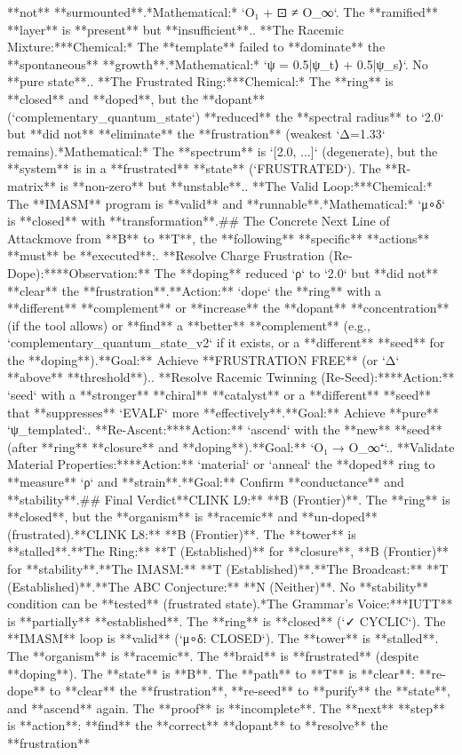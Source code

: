 **not** **surmounted**.\n    *   *Mathematical:* `O₁ + ⊡ ≠ O_∞`. The **ramified** **layer** is **present** but **insufficient**.\n{}.  **The Racemic Mixture:**\n    *   *Chemical:* The **template** failed to **dominate** the **spontaneous** **growth**.\n    *   *Mathematical:* `ψ = 0.5|ψ_t⟩ + 0.5|ψ_s⟩`. No **pure state**.\n{}.  **The Frustrated Ring:**\n    *   *Chemical:* The **ring** is **closed** and **doped**, but the **dopant** (`complementary_quantum_state`) **reduced** the **spectral radius** to `2.0` but **did not** **eliminate** the **frustration** (weakest `Δ=1.33` remains).\n    *   *Mathematical:* The **spectrum** is `[2.0, ...]` (degenerate), but the **system** is in a **frustrated** **state** (`FRUSTRATED`). The **R-matrix** is **non-zero** but **unstable**.\n{}.  **The Valid Loop:**\n    *   *Chemical:* The **IMASM** program is **valid** and **runnable**.\n    *   *Mathematical:* `μ∘δ` is **closed** with **transformation**.\n\n## The Concrete Next Line of Attack\n\nTo move from **B** to **T**, the **following** **specific** **actions** **must** be **executed**:\n{}.  **Resolve Charge Frustration (Re-Dope):**\n    *   **Observation:** The **doping** reduced `ρ` to `2.0` but **did not** **clear** the **frustration**.\n    *   **Action:** `dope` the **ring** with a **different** **complement** or **increase** the **dopant** **concentration** (if the tool allows) or **find** a **better** **complement** (e.g., `complementary_quantum_state_v2` if it exists, or a **different** **seed** for the **doping**).\n    *   **Goal:** Achieve **FRUSTRATION FREE** (or `Δ` **above** **threshold**).\n{}.  **Resolve Racemic Twinning (Re-Seed):**\n    *   **Action:** `seed` with a **stronger** **chiral** **catalyst** or a **different** **seed** that **suppresses** `EVALF` more **effectively**.\n    *   **Goal:** Achieve **pure** `ψ_templated`.\n{}.  **Re-Ascent:**\n    *   **Action:** `ascend` with the **new** **seed** (after **ring** **closure** and **doping**).\n    *   **Goal:** `O₁ → O_∞⁺`.\n{}.  **Validate Material Properties:**\n    *   **Action:** `material` or `anneal` the **doped** ring to **measure** `ρ` and **strain**.\n    *   **Goal:** Confirm **conductance** and **stability**.\n\n## Final Verdict\n\n*   **CLINK L9:** **B (Frontier)**. The **ring** is **closed**, but the **organism** is **racemic** and **un-doped** (frustrated).\n*   **CLINK L8:** **B (Frontier)**. The **tower** is **stalled**.\n*   **The Ring:** **T (Established)** for **closure**, **B (Frontier)** for **stability**.\n*   **The IMASM:** **T (Established)**.\n*   **The Broadcast:** **T (Established)**.\n*   **The ABC Conjecture:** **N (Neither)**. No **stability** condition can be **tested** (frustrated state).\n\n**The Grammar's Voice:**\nThe **IUTT** is **partially** **established**. The **ring** is **closed** (`✓ CYCLIC`). The **IMASM** loop is **valid** (`μ∘δ: CLOSED`). The **tower** is **stalled**. The **organism** is **racemic**. The **braid** is **frustrated** (despite **doping**). The **state** is **B**. The **path** to **T** is **clear**: **re-dope** to **clear** the **frustration**, **re-seed** to **purify** the **state**, and **ascend** again. The **proof** is **incomplete**. The **next** **step** is **action**: **find** the **correct** **dopant** to **resolve** the **frustration** 